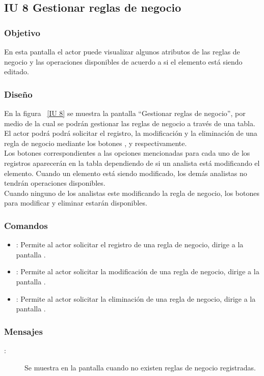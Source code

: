 \subsection{IU 8 Gestionar reglas de negocio}
\subsubsection{Objetivo}
	
	En esta pantalla el actor puede visualizar algunos atributos de las reglas de negocio y las operaciones disponibles de acuerdo a si el elemento está siendo editado.

\subsubsection{Diseño}

    En la figura ~\ref{IU 8} se muestra la pantalla ``Gestionar reglas de negocio'', por medio de la cual 
    se podrán gestionar las reglas de negocio a través de una tabla.
    El actor podrá podrá solicitar el registro, la modificación y la eliminación de una regla de negocio mediante los botones
    , \btnEditar y \btnEliminar respectivamente. \\
    
    Los botones correspondientes a las opciones mencionadas para cada uno de los registros aparecerán en la tabla dependiendo de si 
    un analista está modificando el elemento. Cuando un elemento está siendo modificado, los demás analistas no tendrán operaciones disponibles.\\
   
    Cuando ninguno de los analistas este modificando la regla de negocio, los botones para modificar y eliminar estarán disponibles.
    


\subsubsection{Comandos}
\begin{itemize}
	\item {}: Permite al actor solicitar el registro de una regla de negocio, dirige a la pantalla .
	\item \btnEditar[Modificar]: Permite al actor solicitar la modificación de una regla de negocio, dirige a la pantalla .
	\item \btnEliminar[Eliminar]: Permite al actor solicitar la eliminación de una regla de negocio, dirige a la pantalla .
\end{itemize}

\subsubsection{Mensajes}

	
\begin{description}
	\item[:] Se muestra en la pantalla  cuando no existen reglas de negocio registradas.
\end{description}
